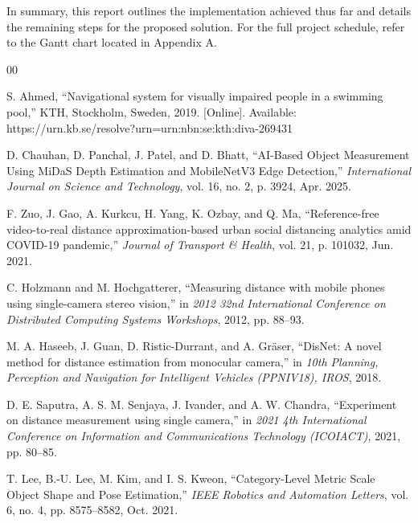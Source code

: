 \documentclass[conference]{IEEEtran}
\begin{document}
In summary, this report outlines the implementation achieved thus far and details the remaining steps for the proposed solution.
For the full project schedule, refer to the Gantt chart located in Appendix A.


\begin{thebibliography}{00}

    S. Ahmed, ``Navigational system for visually impaired people in a swimming pool,'' KTH, Stockholm, Sweden, 2019. [Online]. Available: https://urn.kb.se/resolve?urn=urn:nbn:se:kth:diva-269431

    D. Chauhan, D. Panchal, J. Patel, and D. Bhatt, ``AI-Based Object Measurement Using MiDaS Depth Estimation and MobileNetV3 Edge Detection,'' \emph{International Journal on Science and Technology}, vol. 16, no. 2, p. 3924, Apr. 2025.

    F. Zuo, J. Gao, A. Kurkcu, H. Yang, K. Ozbay, and Q. Ma, ``Reference-free video-to-real distance approximation-based urban social distancing analytics amid COVID-19 pandemic,'' \emph{Journal of Transport \& Health}, vol. 21, p. 101032, Jun. 2021.

    C. Holzmann and M. Hochgatterer, ``Measuring distance with mobile phones using single-camera stereo vision,'' in \emph{2012 32nd International Conference on Distributed Computing Systems Workshops}, 2012, pp. 88--93.

    M. A. Haseeb, J. Guan, D. Ristic-Durrant, and A. Gräser, ``DisNet: A novel method for distance estimation from monocular camera,'' in \emph{10th Planning, Perception and Navigation for Intelligent Vehicles (PPNIV18), IROS}, 2018.

    D. E. Saputra, A. S. M. Senjaya, J. Ivander, and A. W. Chandra, ``Experiment on distance measurement using single camera,'' in \emph{2021 4th International Conference on Information and Communications Technology (ICOIACT)}, 2021, pp. 80--85.

    T. Lee, B.-U. Lee, M. Kim, and I. S. Kweon, ``Category-Level Metric Scale Object Shape and Pose Estimation,'' \emph{IEEE Robotics and Automation Letters}, vol. 6, no. 4, pp. 8575--8582, Oct. 2021.


\end{thebibliography}
\end{document}
